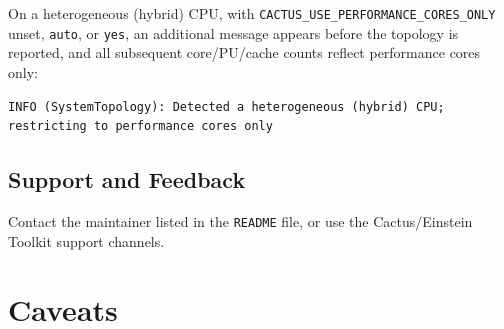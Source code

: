 On a heterogeneous (hybrid) CPU, with
\texttt{CACTUS\_USE\_PERFORMANCE\_CORES\_ONLY} unset, \texttt{auto}, or
\texttt{yes}, an additional message appears before the topology is
reported, and all subsequent core/PU/cache counts reflect performance
cores only:
\begin{verbatim}
INFO (SystemTopology): Detected a heterogeneous (hybrid) CPU;
restricting to performance cores only
\end{verbatim}

\subsection{Support and Feedback}

Contact the maintainer listed in the \texttt{README} file, or use the
Cactus/Einstein Toolkit support channels.

\section{Caveats}

